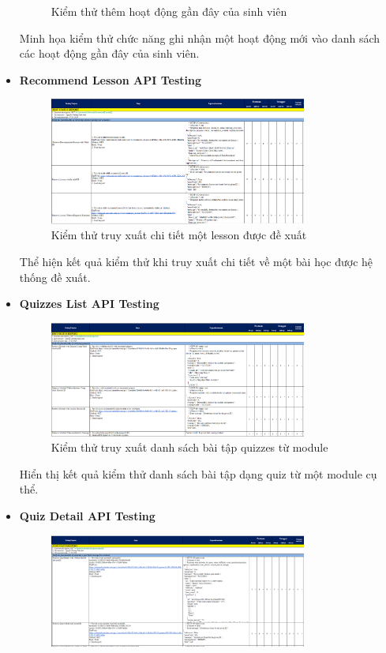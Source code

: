 \begin{itemize}
\begin{figure}[H]
        \caption{Kiểm thử thêm hoạt động gần đây của sinh viên}
    \end{figure}
    Minh họa kiểm thử chức năng ghi nhận một hoạt động mới vào danh sách các hoạt động gần đây của sinh viên.
    \item \textbf{Recommend Lesson API Testing}
    \begin{figure}[H]
        \centering
        \includegraphics[width=0.8\textwidth]{Images/test/test_RL.png}
        \caption{Kiểm thử truy xuất chi tiết một lesson được đề xuất}
    \end{figure}
    Thể hiện kết quả kiểm thử khi truy xuất chi tiết về một bài học được hệ thống đề xuất.
    \item \textbf{Quizzes List API Testing}
    \begin{figure}[H]
        \centering
        \includegraphics[width=0.8\textwidth]{Images/test/test_QL.png}
        \caption{Kiểm thử truy xuất danh sách bài tập quizzes từ module}
    \end{figure}
    Hiển thị kết quả kiểm thử danh sách bài tập dạng quiz từ một module cụ thể.
    \item \textbf{Quiz Detail API Testing}
    \begin{figure}[H]
        \centering
        \includegraphics[width=0.8\textwidth]{Images/test/test_DQ.png}

\end{figure}
\end{itemize}
